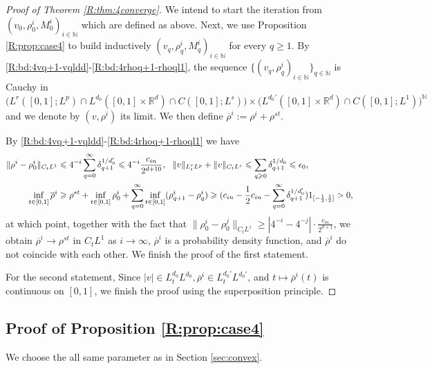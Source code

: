 \documentclass[UTF-8,reqno]{amsart}
\numberwithin{equation}{section}
\theoremstyle{definition}
\def\({{\Big(}}
\def\){{\Big)}}
\def\mN{{\mathbb N}}
\def\geq{\geqslant}
\def\leq{\leqslant}
\def\({{\Big(}}
\def\){{\Big)}}
\def\geq{\geqslant}
\def\leq{\leqslant}
\def\N{\mathbb N} \def\kk{\zeta} \def\m{{\bf m}}
\begin{document}
 \begin{proof}[Proof of   Theorem \ref{R:thm:4converge}]
We intend to start the iteration from 
$(v_0, \rho^{i}_0,  M^{i}_0)_{i\in\mN}$ which are defined as above. 
 Next, we use Proposition \ref{R:prop:case4} to build inductively $(v_q,\rho^{i}_q, M^{i}_q)_{i\in\mN}$ for every $q \geq 1$. By   \eqref{R:bd:4vq+1-vqldd}-\eqref{R:bd:4rhoq+1-rhoql1}, the sequence $\{(v_q,\rho^{i}_q)_{i\in\mN}\}_{q\in \N}$ is
Cauchy in 
$\(L^r([0,1];L^p)\cap L^{d_0}([0,1]\times \mathbb{R}^d)\cap C([0,1];L^s)\)\times \(L^{d_0'}([0,1]\times \mathbb{R}^d)\cap C([0,1];L^1)\)^{\mN}$ 
     and we denote by $(v,\rho^{i})$ its limit.    We then define $\overline \rho^i:=\rho^i+\rho^{st}$.  
   

 By \eqref{R:bd:4vq+1-vqldd}-\eqref{R:bd:4rhoq+1-rhoql1} we have
\begin{align} 
  \|\rho^i-\rho_0^i\|_{C_tL^1}&\leq
4^{-i}\sum_{q=0}^\infty\delta_{q+1}^{1/{d_0'}}\leq 4^{-i} \frac{c_{in}}{2^{d+10}},\  \  \|v \|_{L^{r}_tL^{p}}+\|v  \|_{C_tL^s}\leq 
\sum_{q\geq0}\delta_{q+1}^{1/d_0}\leq\epsilon_0,\notag\\
\inf_{t\in [0,1]}\overline \rho^i &\geq \rho^{st}+ \inf_{t\in [0,1]} \rho_0^i +
\sum_{q=0}^\infty \inf_{t\in [0,1]}(\rho_{q+1}^i- \rho_q^i) \geq (c_{in}-\frac12c_{in}-\sum_{q=0}^\infty \delta_{q+1}^{1/d_0'})1_{[-\frac12,\frac12]}>0,\notag
\end{align}
at which point, together with the fact that $\|\rho^i_0-\rho_0^j\|_{C_tL^1}\geq |4^{-i}-4^{-j}|\cdot \frac{c_{in}}{2^{d+1}}$, we obtain $\overline\rho^i\to \rho^{st}$ in $ C_tL^1$ as $i\to\infty$,   
 $\overline\rho^{i}$ is a  probability density function, and $\overline\rho^i$
 do not coincide with each other. 
 We finish the proof of the first statement. 

 For the second statement,
Since $|v| \in L_{t}^{d_0 }L^{d_0 },\overline \rho^i \in L_{t}^{d_0'}L^{d_0'}$,  and 
$
t\mapsto \overline\rho^i(t)
$
is continuous on $[0,1]$, we finish the proof using the superposition principle.
 \end{proof}

\subsection{ Proof of Proposition \ref{R:prop:case4}} 
We choose the all same parameter as in Section \ref{sec:convex}.
\end{document}
